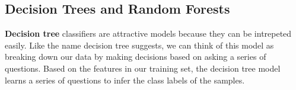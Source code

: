 \documentclass[a4paper,11pt]{article}
\begin{document}
\subsection{Decision Trees and Random Forests}

\textbf{Decision tree} classifiers are attractive models because they can be intrepeted easily. Like the name decision tree suggests, we can think of this model as breaking down our data by making decisions based on asking a series of questions.
Based on the features in our training set, the decision tree model learns a series of questions to infer the class labels of the samples. 

\end{document}
